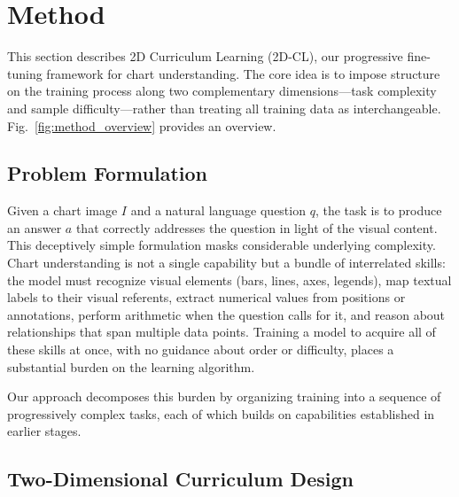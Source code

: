 \documentclass[journal]{IEEEtran}
\newcommand{\method}{2D-CL}
\newcommand{\fullmethod}{2D Curriculum Learning}
\begin{document}
\section{Method}
This section describes \fullmethod{} (\method{}), our progressive fine-tuning framework for chart understanding. The core idea is to impose structure on the training process along two complementary dimensions---task complexity and sample difficulty---rather than treating all training data as interchangeable. Fig.~\ref{fig:method_overview} provides an overview.

\subsection{Problem Formulation}
\label{sec:problem}
Given a chart image $I$ and a natural language question $q$, the task is to produce an answer $a$ that correctly addresses the question in light of the visual content. This deceptively simple formulation masks considerable underlying complexity. Chart understanding is not a single capability but a bundle of interrelated skills: the model must recognize visual elements (bars, lines, axes, legends), map textual labels to their visual referents, extract numerical values from positions or annotations, perform arithmetic when the question calls for it, and reason about relationships that span multiple data points. Training a model to acquire all of these skills at once, with no guidance about order or difficulty, places a substantial burden on the learning algorithm.

Our approach decomposes this burden by organizing training into a sequence of progressively complex tasks, each of which builds on capabilities established in earlier stages.

\subsection{Two-Dimensional Curriculum Design}
\label{sec:2d_curriculum}
\end{document}
